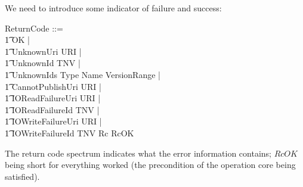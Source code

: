 \documentclass[a4paper,titlepage,twoside,12pt]{article}
\begin{document}
We need to introduce some indicator of failure and success:
\begin{zed}
	ReturnCode ::= \\
	\t1 OK | \\
	\t1 UnknownUri \ldata URI \rdata | \\
	\t1 UnknownId \ldata TNV \rdata | \\
	\t1 UnknownIds \ldata Type \cross Name \cross VersionRange \rdata | \\
	\t1 CannotPublishUri \ldata URI \rdata | \\
	\t1 IOReadFailureUri \ldata URI \rdata | \\
	\t1 IOReadFailureId \ldata TNV \rdata | \\
	\t1 IOWriteFailureUri \ldata URI \rdata |	\\
	\t1 IOWriteFailureId \ldata TNV \rdata
\also
	Rc 
\also
	RcOK 
\end{zed}
The return code spectrum indicates what the error information contains; $RcOK$ being short for everything worked (the
precondition of the operation core being satisfied).
\end{document}
